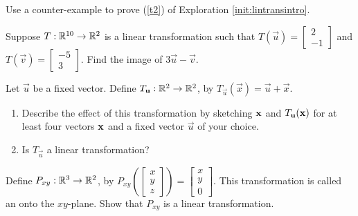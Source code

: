 \documentclass{ximera}
\begin{document}
\begin{problem}\label{prob:prob2}
Use a counter-example to prove (\ref{t2}) of Exploration \ref{init:lintransintro}.
\end{problem}

\begin{problem}\label{prob:imageoflincomb}
Suppose $T:\RR^{10}\rightarrow\RR^2$ is a linear transformation such that $T(\vec{u})=\begin{bmatrix}2\\-1\end{bmatrix}$ and $T(\vec{v})=\begin{bmatrix}-5\\3\end{bmatrix}$.  Find the image of $3\vec{u}-\vec{v}$.
\end{problem}


\begin{problem}\label{prob:notlinear} 
Let $\vec{u}$ be a fixed vector.  Define $T_{\vec{u}}:\RR^2\rightarrow\RR^2$, by $T_{\vec{u}}(\vec{x})=\vec{u}+\vec{x}$.
  \begin{enumerate}
  \item 
  Describe the effect of this transformation by sketching ${\bf x}$ and $T_{\vec{u}}({\bf x})$ for at least four vectors ${\bf x}$ and a fixed vector $\vec{u}$ of your choice.
  \item 
  Is $T_{\vec{u}}$ a linear transformation?
  \end{enumerate}
\end{problem}

\begin{problem}\label{prob:projectiontrans}
Define $P_{xy}:\RR^3\rightarrow\RR^2$, by $P_{xy}\left(\begin{bmatrix}
x\\
y\\
z
\end{bmatrix} \right)=\begin{bmatrix}
x\\
y\\
0
\end{bmatrix}$.  This transformation is called an  onto the $xy$-plane.  Show that $P_{xy}$ is a linear transformation.
\end{problem}
\end{document}
